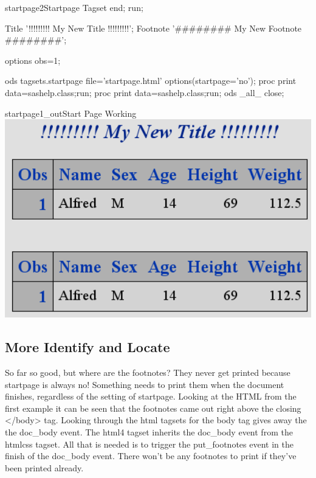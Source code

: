 \begin{fvcode}{startpage2}{Startpage Tagset}
    end;
run;

Title '!!!!!!!!! My New Title !!!!!!!!!';
Footnote '######## My New Footnote ########';

options obs=1;

ods tagsets.startpage file='startpage.html' options(startpage='no');
proc print data=sashelp.class;run;
proc print data=sashelp.class;run;
ods _all_ close;

\end{fvcode}

\begin{goutput}{startpage1_out}{Start Page Working}
\includegraphics[width=6in]{startpage1.png}
\end{goutput}


\subsection{More Identify and Locate}
So far so good, but where are the footnotes? They never get printed
because startpage is always no! Something needs to print them when
the document finishes, regardless of the setting of startpage.
Looking at the HTML from the first example it can be seen that the
footnotes came out right above the closing </body> tag.  Looking
through the html tagsets for the body tag gives away the the doc\_body
event.  The html4 tagset inherits the doc\_body event from the htmlcss
tagset.  All that is needed is to trigger the put\_footnotes event
in the finish of the doc\_body event.  There won't be any footnotes
to print if they've been printed already.

